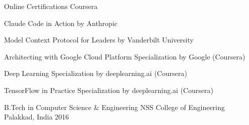 \begin{cventries}

	\cventry
	{Online Certifications} %
	{Coursera} %
	{} %
	{} %
	{
		\begin{cvitems} %
		    \item {
		        Claude Code in Action by Anthropic
		    }
		    \item {
		        Model Context Protocol for Leaders by Vanderbilt University
		    }
		    \item {
		        Architecting with Google Cloud Platform Specialization by Google (Coursera)
		    }
		    \item {
		        Deep Learning Specialization by deeplearning.ai (Coursera)
		    }
		    \item {
		        TensorFlow in Practice Specialization by deeplearning.ai (Coursera)
		    }
		\end{cvitems}
	}

	\cventry
	{B.Tech in Computer Science \& Engineering} %
	{NSS College of Engineering} %
	{Palakkad, India} %
	{2016} %
	{
	}

\end{cventries}
